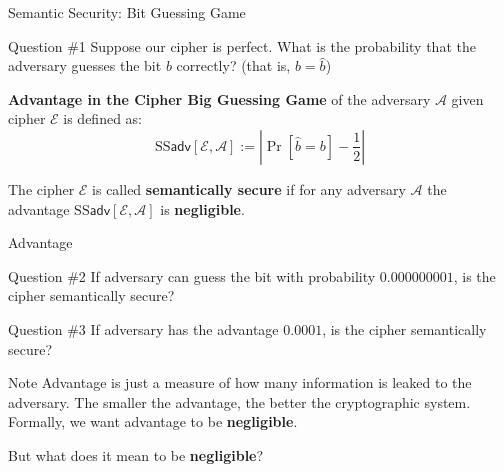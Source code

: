 \documentclass{beamer}
\begin{document}
    \begin{frame}{Semantic Security: Bit Guessing Game}

        \begin{alertblock}{Question \#1}
            Suppose our cipher is perfect. What is the probability that the adversary guesses the bit $b$ correctly? (that is, $b = \hat{b}$)
        \end{alertblock}

        \begin{definition}
            \textbf{Advantage in the Cipher Big Guessing Game} of the adversary $\mathcal{A}$ given cipher $\mathcal{E}$ is defined as:
            \begin{equation*}
                \text{SS}\mathsf{adv}[\mathcal{E}, \mathcal{A}] := \left| \Pr[\hat{b} = b] - \frac{1}{2} \right|
            \end{equation*}
        \end{definition}

        \begin{definition}
            The cipher $\mathcal{E}$ is called \textbf{semantically secure} if for any adversary $\mathcal{A}$ the advantage $\text{SS}\mathsf{adv}[\mathcal{E}, \mathcal{A}]$ is \textbf{negligible}.
        \end{definition}
    \end{frame}

    \begin{frame}{Advantage}
        \begin{alertblock}{Question \#2}
            If adversary can guess the bit with probability $0.000000001$, is the cipher semantically secure?
        \end{alertblock}

        \begin{alertblock}{Question \#3}
            If adversary has the advantage $0.0001$, is the cipher semantically secure?
        \end{alertblock}

        \begin{block}{Note}
            Advantage is just a measure of how many information is leaked to the adversary. The smaller the advantage, the better the cryptographic system. Formally, we want advantage to be \textbf{negligible}.
        \end{block}

        But what does it mean to be \textbf{negligible}?
    
    \end{frame}
\end{document}
